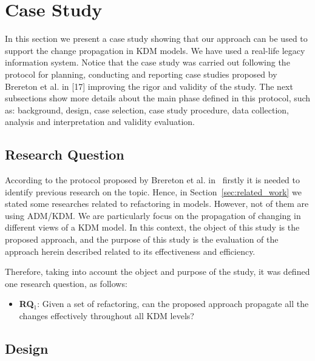 
\section{Case Study}

In this section we present a case study showing that our approach can be used to support the change propagation in KDM models. We have used a real-life legacy information system. 
Notice that the case study was carried out following the protocol for planning, conducting and reporting case studies proposed by Brereton et al. in [17] improving the rigor and validity of the study. The next subsections show more details about the main phase defined in this protocol, such as: background, design, case selection, case study procedure, data collection, analysis and interpretation and validity evaluation.

\subsection{Research Question}

According to the protocol proposed by Brereton et al. in~\cite{Brereton:2008} firstly it is needed to identify previous research on the topic. Hence, in Section~\ref{sec:related_work} we stated some researches related to refactoring in models. However, not of them are using ADM/KDM. We are particularly focus on the propagation of changing in different views of a KDM model. In this context, the object of this study is the proposed approach, and the purpose of this study is the evaluation of the approach herein described related to its effectiveness and efficiency.

Therefore, taking into account the object and purpose of the study, it was defined one research question, as follows:

\begin{itemize}
\item \textbf{RQ$_1$}: Given a set of refactoring, can the proposed approach propagate all the changes effectively throughout all KDM levels?
\end{itemize}


\subsection{Design}

